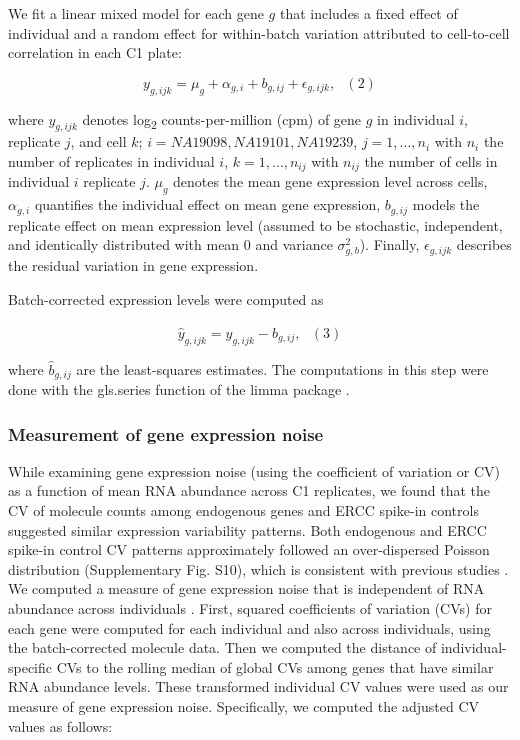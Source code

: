 We fit a linear mixed model for each gene $g$ that includes a fixed
effect of individual and a random effect for within-batch variation
attributed to cell-to-cell correlation in each C1 plate:

\[ y_{g,ijk} = \mu_{g} + \alpha_{g,i} + b_{g,ij} + \epsilon_{g,ijk}, \,\,\,\,(2)\]

where $y_{g,ijk}$ denotes log\textsubscript{2} counts-per-million (cpm)
of gene $g$ in individual $i$, replicate $j$, and cell $k$;
$i = NA19098, NA19101, NA19239$, $j = 1, \dots, n_i$ with $n_i$ the
number of replicates in individual $i$, $k = 1, \dots, n_{ij}$ with
$n_{ij}$ the number of cells in individual $i$ replicate $j$. $\mu_g$
denotes the mean gene expression level across cells, $\alpha_{g,i}$
quantifies the individual effect on mean gene expression, $b_{g,ij}$
models the replicate effect on mean expression level (assumed to be
stochastic, independent, and identically distributed with mean 0 and
variance $\sigma^2_{g,b}$). Finally, $\epsilon_{g,ijk}$ describes the
residual variation in gene expression.

Batch-corrected expression levels were computed as

\[ \widehat{y}_{g,ijk} = y_{g,ijk} - \widehat{b}_{g,ij}, \,\,\,\,(3)\]

where $\widehat{b}_{g,ij}$ are the least-squares estimates. The
computations in this step were done with the gls.series function of the
limma package \citep{limma}.

\subsubsection{Measurement of gene expression
noise}\label{measurement-of-gene-expression-noise}

While examining gene expression noise (using the coefficient of
variation or CV) as a function of mean RNA abundance across C1
replicates, we found that the CV of molecule counts among endogenous
genes and ERCC spike-in controls suggested similar expression
variability patterns. Both endogenous and ERCC spike-in control CV
patterns approximately followed an over-dispersed Poisson distribution
(Supplementary Fig. S10), which is consistent with previous studies
\citep{Islam2014, Brennecke2013}. We computed a measure of gene
expression noise that is independent of RNA abundance across individuals
\citep{Kolodziejczyk2015, Newman2006}. First, squared coefficients of
variation (CVs) for each gene were computed for each individual and also
across individuals, using the batch-corrected molecule data. Then we
computed the distance of individual-specific CVs to the rolling median
of global CVs among genes that have similar RNA abundance levels. These
transformed individual CV values were used as our measure of gene
expression noise. Specifically, we computed the adjusted CV values as
follows:

